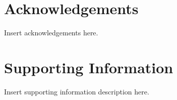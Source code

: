

\section*{Acknowledgements}

Insert acknowledgements here.



\section*{Supporting Information}

Insert supporting information description here.

